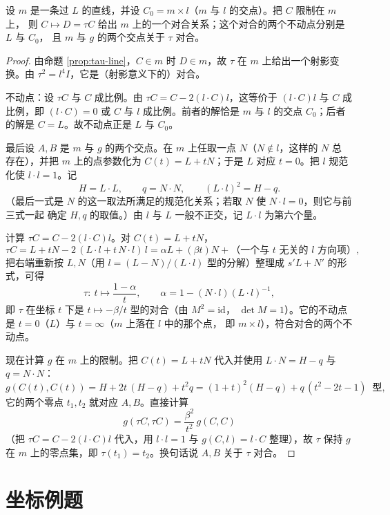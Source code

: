 \begin{proposition}
\label{prop:tau-involution}
设 $m$ 是一条过 $L$ 的直线，并设 $C_0=m\times l$（$m$ 与 $l$ 的交点）。把 $C$ 限制在 $m$ 上，
则 $C\mapsto D=\tau C$ 给出 $m$ 上的一个对合关系；这个对合的两个不动点分别是 $L$ 与 $C_0$，
且 $m$ 与 $g$ 的两个交点关于 $\tau$ 对合。
\end{proposition}

\begin{proof}
由命题 \ref{prop:tau-line}，$C\in m$ 时 $D\in m$，故 $\tau$ 在 $m$ 上给出一个射影变换。由
$\tau^2=l^4I$，它是（射影意义下的）对合。

不动点：设 $\tau C$ 与 $C$ 成比例。由 $\tau C=C-2(l\cdot C)l$，这等价于 $(l\cdot C)l$ 与
$C$ 成比例，即 $(l\cdot C)=0$ 或 $C$ 与 $l$ 成比例。前者的解恰是 $m$ 与 $l$ 的交点
$C_0$；后者的解是 $C=L$。故不动点正是 $L$ 与 $C_0$。

最后设 $A,B$ 是 $m$ 与 $g$ 的两个交点。在 $m$ 上任取一点 $N$（$N\notin l$，这样的 $N$ 总
存在），并把 $m$ 上的点参数化为 $C(t)=L+tN$；于是 $L$ 对应 $t=0$。把 $l$ 规范化使
$l\cdot l=1$。记
\[
H=L\cdot L,\qquad q=N\cdot N,\qquad (L\cdot l)^2=H-q .
\]
（最后一式是 $N$ 的这一取法所满足的规范化关系；若取 $N$ 使 $N\cdot l=0$，则它与前三式一起
确定 $H,q$ 的取值。）由 $l$ 与 $L$ 一般不正交，记 $L\cdot l$ 为第六个量。

计算 $\tau C=C-2(l\cdot C)l$。对 $C(t)=L+tN$，
\[
\tau C=L+tN-2\,(L\cdot l+t\,N\cdot l)\,l
=\alpha L+(\beta t)N+\text{（一个与 }t\text{ 无关的 $l$ 方向项）},
\]
把右端重新按 $L,N$（用 $l=(L-N)/(L\cdot l)$ 型的分解）整理成 $s'L+N'$ 的形式，可得
\[
\tau:\ t\longmapsto \frac{1-\alpha}{t},\qquad
\alpha=1-(N\cdot l)(L\cdot l)^{-1} ,
\]
即 $\tau$ 在坐标 $t$ 下是 $t\mapsto-\beta/t$ 型的对合（由 $M^2=\mathrm{id}$，
$\det M=1$）。它的不动点是 $t=0$（$L$）与 $t=\infty$（$m$ 上落在 $l$ 中的那个点，
即 $m\times l$），符合对合的两个不动点。

现在计算 $g$ 在 $m$ 上的限制。把 $C(t)=L+tN$ 代入并使用 $L\cdot N=H-q$ 与 $q=N\cdot N$：
\[
g(C(t),C(t))=H+2t\,(H-q)+t^2q=(1+t)^2(H-q)+q\,(t^2-2t-1)\ \text{ 型},
\]
它的两个零点 $t_1,t_2$ 就对应 $A,B$。直接计算
\[
g(\tau C,\tau C)=\frac{\beta^2}{t^2}\,g(C,C)
\]
（把 $\tau C=C-2(l\cdot C)l$ 代入，用 $l\cdot l=1$ 与 $g(C,l)=l\cdot C$ 整理），故 $\tau$ 保持
$g$ 在 $m$ 上的零点集，即 $\tau(t_1)=t_2$。换句话说 $A,B$ 关于 $\tau$ 对合。
\end{proof}

\section{坐标例题}

